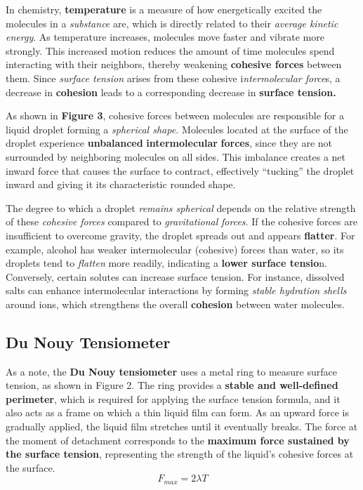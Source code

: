 \documentclass[12pt]{article}
\begin{document}
In chemistry, \textbf{temperature} is a measure of how energetically excited the molecules in a \textit{substance} are, which is directly related to their \textit{average kinetic energy}. As temperature increases, molecules move faster and vibrate more strongly. This increased motion reduces the amount of time molecules spend interacting with their neighbors, thereby weakening \textbf{cohesive forces} between them. Since \textit{surface tension }arises from these cohesive i\textit{ntermolecular force}s, a decrease in \textbf{cohesion} leads to a corresponding decrease in \textbf{surface tension.}

\vspace{0.3cm}
As shown in \textbf{Figure 3}, cohesive forces between molecules are responsible for a liquid droplet forming a\textit{ spherical shape.} Molecules located at the surface of the droplet experience \textbf{unbalanced} \textbf{intermolecular} \textbf{forces}, since they are not surrounded by neighboring molecules on all sides. This imbalance creates a net inward force that causes the surface to contract, effectively “tucking” the droplet inward and giving it its characteristic rounded shape.

\vspace{0.3cm}
The degree to which a droplet \textit{remains spherical }depends on the relative strength of these \textit{cohesive forces} compared to \textit{gravitational} \textit{forces}. If the cohesive forces are insufficient to overcome gravity, the droplet spreads out and appears \textbf{flatter}. For example, alcohol has weaker intermolecular (cohesive) forces than water, so its droplets tend to \textit{flatten} more readily, indicating a\textbf{ lower surface tensio}n. Conversely, certain solutes can increase surface tension. For instance, dissolved salts can enhance intermolecular interactions by forming \textit{stable hydration shells }around ions, which strengthens the overall \textbf{cohesion} between water molecules.

\subsection{Du Nouy Tensiometer}
As a note, the \textbf{Du Nouy tensiometer} uses a metal ring to measure surface tension, as shown in Figure 2. The ring provides a \textbf{stable and well-defined perimeter}, which is required for applying the surface tension formula, and it also acts as a frame on which a thin liquid film can form. As an upward force is gradually applied, the liquid film stretches until it eventually breaks. The force at the moment of detachment corresponds to the \textbf{maximum force sustained by the surface tension}, representing the strength of the liquid’s cohesive forces at the surface.
\[F_{max}=2\lambda T\]
\end{document}
